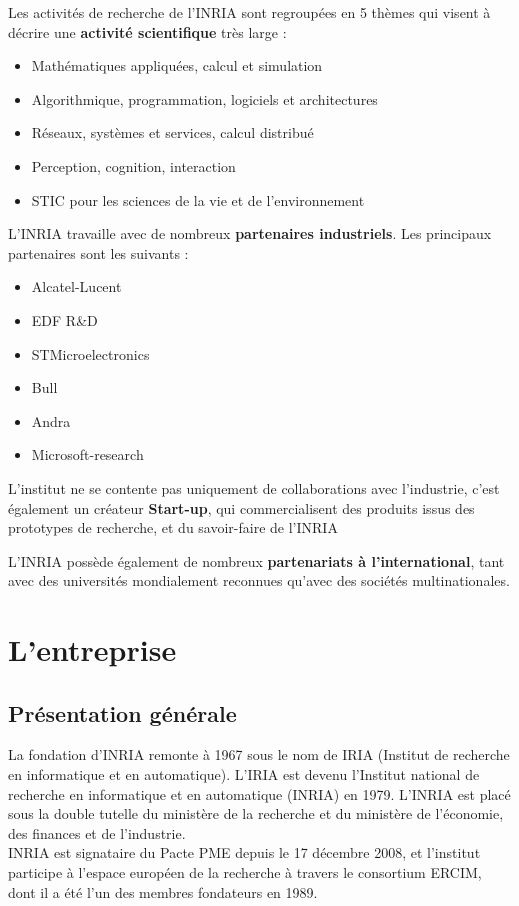 \documentclass[a4paper, 11pt]{report}
\begin{document}
  Les activités de recherche de l'INRIA sont regroupées en 5 thèmes qui visent
  à décrire une \textbf{activité scientifique} très large :
  \begin{itemize}
    \item Mathématiques appliquées, calcul et simulation
    \item Algorithmique, programmation, logiciels et architectures
    \item Réseaux, systèmes et services, calcul distribué
    \item Perception, cognition, interaction
    \item STIC pour les sciences de la vie et de l'environnement
  \end{itemize}

  L'INRIA travaille avec de nombreux \textbf{partenaires industriels}.
  Les principaux partenaires sont les suivants :
  \begin{itemize}
    \item Alcatel-Lucent
    \item EDF R\&D
    \item STMicroelectronics
    \item Bull
    \item Andra
    \item Microsoft-research \\
  \end{itemize}

  L'institut ne se contente pas uniquement de collaborations avec l'industrie,
  c'est également un créateur \textbf{Start-up}, qui commercialisent des
  produits issus des prototypes de recherche, et du savoir-faire de l'INRIA

  L'INRIA possède également de nombreux \textbf{partenariats à
  l'international}, tant avec des universités mondialement reconnues qu'avec
  des sociétés multinationales.

  \section{L'entreprise}
    \subsection{Présentation générale}
    La fondation d'INRIA remonte à 1967 sous le nom de IRIA (Institut de
    recherche en informatique et en automatique). L'IRIA est devenu l'Institut
    national de recherche en informatique et en automatique (INRIA) en 1979.
    L'INRIA est placé sous la double tutelle du ministère de la recherche et
    du ministère de l'économie, des finances et de l'industrie. \\
    INRIA est signataire du Pacte PME depuis le 17 décembre 2008, et l'institut
    participe à l'espace européen de la recherche à travers le consortium
    ERCIM, dont il a été l'un des membres fondateurs en 1989.
\end{document}
